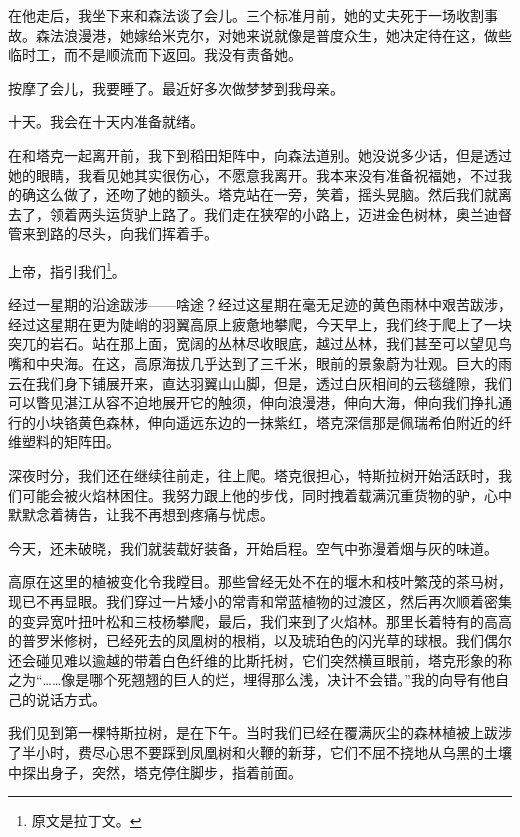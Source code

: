 \documentclass[AutoFakeBold=true]{book}
\begin{document}
在他走后，我坐下来和森法谈了会儿。三个标准月前，她的丈夫死于一场收割事故。森法浪漫港，她嫁给米克尔，对她来说就像是普度众生，她决定待在这，做些临时工，而不是顺流而下返回。我没有责备她。

按摩了会儿，我要睡了。最近好多次做梦梦到我母亲。

十天。我会在十天内准备就绪。

\vspace*{1em}{\kaishu 第七十五日：}

在和塔克一起离开前，我下到稻田矩阵中，向森法道别。她没说多少话，但是透过她的眼睛，我看见她其实很伤心，不愿意我离开。我本来没有准备祝福她，不过我的确这么做了，还吻了她的额头。塔克站在一旁，笑着，摇头晃脑。然后我们就离去了，领着两头运货驴上路了。我们走在狭窄的小路上，迈进金色树林，奥兰迪督管来到路的尽头，向我们挥着手。

{\kaishu 上帝，指引我们}\footnote{原文是拉丁文。}。

\vspace*{1em}{\kaishu 第八十二日：}

经过一星期的沿途跋涉——啥途？经过这星期在毫无足迹的黄色雨林中艰苦跋涉，经过这星期在更为陡峭的羽翼高原上疲惫地攀爬，今天早上，我们终于爬上了一块突兀的岩石。站在那上面，宽阔的丛林尽收眼底，越过丛林，我们甚至可以望见鸟嘴和中央海。在这，高原海拔几乎达到了三千米，眼前的景象蔚为壮观。巨大的雨云在我们身下铺展开来，直达羽翼山山脚，但是，透过白灰相间的云毯缝隙，我们可以瞥见湛江从容不迫地展开它的触须，伸向浪漫港，伸向大海，伸向我们挣扎通行的小块铬黄色森林，伸向遥远东边的一抹紫红，塔克深信那是佩瑞希伯附近的纤维塑料的矩阵田。

深夜时分，我们还在继续往前走，往上爬。塔克很担心，特斯拉树开始活跃时，我们可能会被火焰林困住。我努力跟上他的步伐，同时拽着载满沉重货物的驴，心中默默念着祷告，让我不再想到疼痛与忧虑。

\vspace*{1em}{\kaishu 第八十三日：}

今天，还未破晓，我们就装载好装备，开始启程。空气中弥漫着烟与灰的味道。

高原在这里的植被变化令我瞠目。那些曾经无处不在的堰木和枝叶繁茂的茶马树，现已不再显眼。我们穿过一片矮小的常青和常蓝植物的过渡区，然后再次顺着密集的变异宽叶扭叶松和三枝杨攀爬，最后，我们来到了火焰林。那里长着特有的高高的普罗米修树，已经死去的凤凰树的根梢，以及琥珀色的闪光草的球根。我们偶尔还会碰见难以逾越的带着白色纤维的比斯托树，它们突然横亘眼前，塔克形象的称之为``……像是哪个死翘翘的巨人的烂，埋得那么浅，决计不会错。''我的向导有他自己的说话方式。

我们见到第一棵特斯拉树，是在下午。当时我们已经在覆满灰尘的森林植被上跋涉了半小时，费尽心思不要踩到凤凰树和火鞭的新芽，它们不屈不挠地从乌黑的土壤中探出身子，突然，塔克停住脚步，指着前面。
\end{document}
